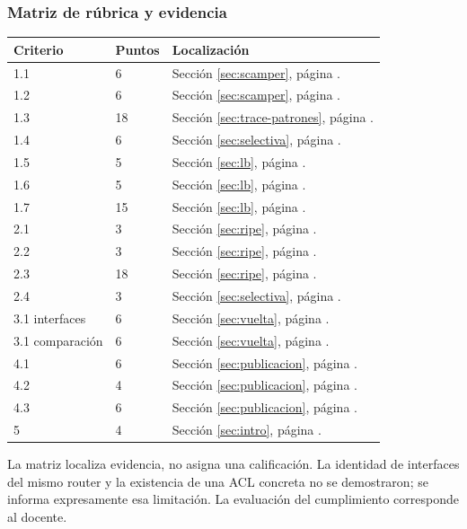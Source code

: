 \subsubsection{Matriz de rúbrica y evidencia}
\begin{longtable}{p{3cm}p{2cm}p{9cm}}\toprule Criterio & Puntos & Localización \\ \midrule\endhead
1.1 & 6 & Sección \ref{sec:scamper}, página \pageref{sec:scamper}. \\
1.2 & 6 & Sección \ref{sec:scamper}, página \pageref{sec:scamper}. \\
1.3 & 18 & Sección \ref{sec:trace-patrones}, página \pageref{sec:trace-patrones}. \\
1.4 & 6 & Sección \ref{sec:selectiva}, página \pageref{sec:selectiva}. \\
1.5 & 5 & Sección \ref{sec:lb}, página \pageref{sec:lb}. \\
1.6 & 5 & Sección \ref{sec:lb}, página \pageref{sec:lb}. \\
1.7 & 15 & Sección \ref{sec:lb}, página \pageref{sec:lb}. \\
2.1 & 3 & Sección \ref{sec:ripe}, página \pageref{sec:ripe}. \\
2.2 & 3 & Sección \ref{sec:ripe}, página \pageref{sec:ripe}. \\
2.3 & 18 & Sección \ref{sec:ripe}, página \pageref{sec:ripe}. \\
2.4 & 3 & Sección \ref{sec:selectiva}, página \pageref{sec:selectiva}. \\
3.1 interfaces & 6 & Sección \ref{sec:vuelta}, página \pageref{sec:vuelta}. \\
3.1 comparación & 6 & Sección \ref{sec:vuelta}, página \pageref{sec:vuelta}. \\
4.1 & 6 & Sección \ref{sec:publicacion}, página \pageref{sec:publicacion}. \\
4.2 & 4 & Sección \ref{sec:publicacion}, página \pageref{sec:publicacion}. \\
4.3 & 6 & Sección \ref{sec:publicacion}, página \pageref{sec:publicacion}. \\
5 & 4 & Sección \ref{sec:intro}, página \pageref{sec:intro}. \\
\bottomrule\end{longtable}
La matriz localiza evidencia, no asigna una calificación. La identidad de interfaces del mismo router y la existencia de una ACL concreta no se demostraron; se informa expresamente esa limitación. La evaluación del cumplimiento corresponde al docente.

